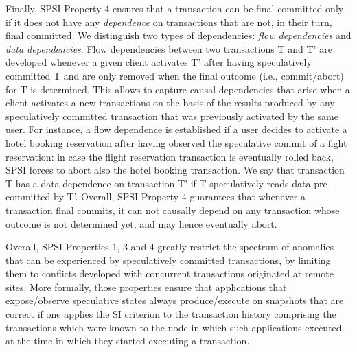 Finally, SPSI Property 4 ensures that a transaction can be final committed only if it does not have any \textit{dependence} on transactions that are not, in their turn, final committed.
We distinguish two types of dependencies: \textit{flow dependencies} and \textit{data dependencies}. Flow dependencies  between two transactions T and T' are developed whenever a given client activates T' after having speculatively committed T and are only removed when the final outcome (i.e., commit/abort) for T is determined. This allows to capture  causal dependencies that arise when a client activates a new transactions on the basis of the results produced by any speculatively committed transaction that was previously activated by the same user. For instance, a flow dependence is established if a user decides to activate a hotel booking reservation after having observed the speculative commit of a fight reservation: in case the flight reservation transaction is eventually rolled back, SPSI forces to abort also the hotel booking transaction. We say that transaction T has a data dependence on transaction T' if T speculatively reads data pre-committed by T'. 
Overall, SPSI Property 4  guarantees that whenever a transaction final commits, it can not causally depend on any  transaction whose outcome is not determined yet, and may hence eventually abort.

Overall, SPSI Properties 1, 3 and 4 greatly restrict the spectrum of anomalies that can be experienced by speculatively committed transactions, by limiting them to conflicts developed with concurrent transactions originated at remote sites. More formally, those properties ensure that applications that expose/observe speculative states always produce/execute on snapshots  that are correct if one applies the SI criterion to the transaction history comprising the transactions which were known to the node in which such applications executed at the time in which they started executing a transaction. 


